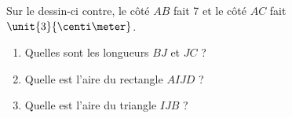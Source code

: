 
\begin{exercice}\label{exoSeconde-0096}

    \begin{multicols}{2}
        Sur le dessin-ci contre, le côté \( AB\) fait \unit{7}{\centi\meter} et le côté \( AC\) fait \( \unit{3}{\centi\meter}\). 
        \begin{enumerate}
            \item
                Quelles sont les longueurs \( BJ\) et \( JC\) ?
            \item
                Quelle est l'aire du rectangle \( AIJD\) ?
            \item
                Quelle est l'aire du triangle \( IJB\) ?
        \end{enumerate}
        
\columnbreak

\begin{center}

\end{center}

    \end{multicols}

\end{exercice}

